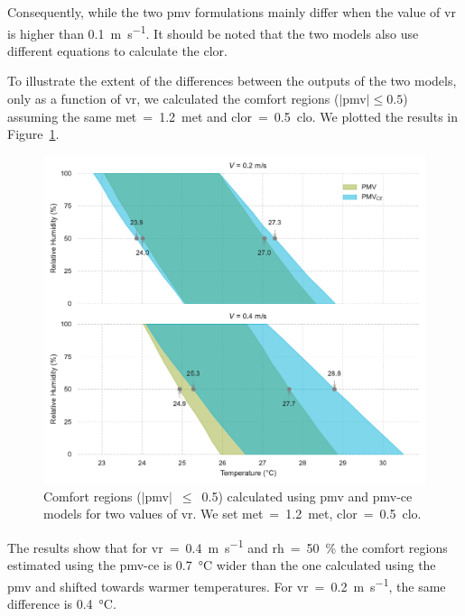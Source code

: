 Consequently, while the two \ac{pmv} formulations mainly differ when the value of \ac{vr} is higher than \qty{0.1}{\m\per\s}.
It should be noted that the two models also use different equations to calculate the \ac{clor}.

To illustrate the extent of the differences between the outputs of the two models, only as a function of \ac{vr}, we calculated the comfort regions ($\mid$\ac{pmv}$\mid \leq 0.5$) assuming the same \ac{met}~=~\qty{1.2}{met} and \ac{clor}~=~\qty{0.5}{clo}.
We plotted the results in Figure~\ref{fig:comfort_regios_pmv_pmvce}.
\begin{figure}[!htb]
    \centering
    \includegraphics[width=1\textwidth]{figures/pmv_comfort_regions}
    \caption{Comfort regions ($|$\ac{pmv}$|$~$\leq$~\num{0.5}) calculated using \ac{pmv} and \ac{pmv-ce} models for two values of \ac{vr}.
    We set \ac{met}~=~\qty{1.2}{met}, \ac{clor}~=~\qty{0.5}{clo}.
    \label{fig:comfort_regios_pmv_pmvce}}
\end{figure}
The results show that for \ac{vr}~=~\qty{0.4}{\m\per\s} and \ac{rh}~=~\qty{50}{\percent} the comfort regions estimated using the \ac{pmv-ce} is \qty{0.7}{\celsius} wider than the one calculated using the \ac{pmv} and shifted towards warmer temperatures.
For \ac{vr}~=~\qty{0.2}{\m\per\s}, the same difference is \qty{0.4}{\celsius}.

